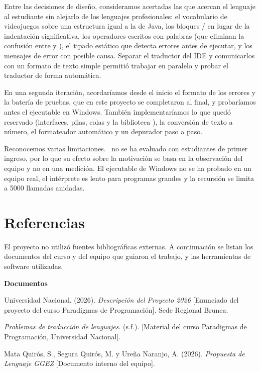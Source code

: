 Entre las decisiones de diseño, consideramos acertadas las que acercan el lenguaje al estudiante sin alejarlo de los lenguajes profesionales: el vocabulario de videojuegos sobre una estructura igual a la de Java, los bloques / en lugar de la indentación significativa, los operadores escritos con palabras (que eliminan la confusión entre \kw{=} y \kw{==}), el tipado estático que detecta errores antes de ejecutar, y los mensajes de error con posible causa. Separar el traductor del IDE y comunicarlos con un formato de texto simple permitió trabajar en paralelo y probar el traductor de forma automática.

En una segunda iteración, acordaríamos desde el inicio el formato de los errores y la batería de pruebas, que en este proyecto se completaron al final, y probaríamos antes el ejecutable en Windows. También implementaríamos lo que quedó reservado (interfaces, pilas, colas y la biblioteca ), la conversión de texto a número, el formateador automático y un depurador paso a paso.

Reconocemos varias limitaciones. \ggez\ no se ha evaluado con estudiantes de primer ingreso, por lo que su efecto sobre la motivación se basa en la observación del equipo y no en una medición. El ejecutable de Windows no se ha probado en un equipo real, el intérprete es lento para programas grandes y la recursión se limita a 5000 llamadas anidadas.

\newpage
\section{Referencias}

El proyecto no utilizó fuentes bibliográficas externas. A continuación se listan los documentos del curso y del equipo que guiaron el trabajo, y las herramientas de software utilizadas.

\begingroup
\setlength{\parindent}{-1.27cm}
\setlength{\leftskip}{1.27cm}

\textbf{Documentos}

Universidad Nacional. (2026). \emph{Descripción del Proyecto 2026} [Enunciado del proyecto del curso Paradigmas de Programación]. Sede Regional Brunca.

\emph{Problemas de traducción de lenguajes}. (s.f.). [Material del curso Paradigmas de Programación, Universidad Nacional].

Mata Quirós, S., Segura Quirós, M. y Ureña Naranjo, A. (2026). \emph{Propuesta de Lenguaje GGEZ} [Documento interno del equipo].

